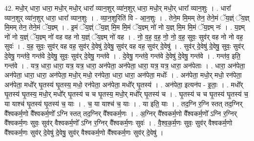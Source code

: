 \documentclass[17pt]{extarticle}
\begin{document}
42. मधो॒र् धारा॒ धारा॒ मधो॒र् मधो॒र् धारा᳚ व्यान॒शुर् व्या॑न॒शुर् धारा॒ मधो॒र् मधो॒र् धारा᳚ व्यान॒शुः । . धारा᳚ व्यान॒शुर् व्या॑न॒शुर् धारा॒ धारा᳚ व्यान॒शुः । . व्या॒न॒शुरिति॑ वि - आ॒न॒शुः । . तेने॒म मि॒मम् तेन॒ तेने॒मं ॅय॒ज्ञ्ं ॅय॒ज्ञ् मि॒मम् तेन॒ तेने॒मं ॅय॒ज्ञ्म् । . इ॒मं ॅय॒ज्ञ्ं ॅय॒ज्ञ् मि॒म मि॒मं ॅय॒ज्ञ्म् नो॑ नो य॒ज्ञ् मि॒म मि॒मं ॅय॒ज्ञ्म् नः॑ । . य॒ज्ञ्म् नो॑ नो य॒ज्ञ्ं ॅय॒ज्ञ्म् नो॑ वह वह नो य॒ज्ञ्ं ॅय॒ज्ञ्म् नो॑ वह । . नो॒ व॒ह॒ व॒ह॒ नो॒ नो॒ व॒ह॒ सुवः॒ सुव॑र् वह नो नो वह॒ सुवः॑ । . व॒ह॒ सुवः॒ सुव॑र् वह वह॒ सुव॑र् दे॒वेषु॑ दे॒वेषु॒ सुव॑र् वह वह॒ सुव॑र् दे॒वेषु॑ । . सुव॑र् दे॒वेषु॑ दे॒वेषु॒ सुवः॒ सुव॑र् दे॒वेषु॒ गन्त॑वे॒ गन्त॑वे दे॒वेषु॒ सुवः॒ सुव॑र् दे॒वेषु॒ गन्त॑वे । . दे॒वेषु॒ गन्त॑वे॒ गन्त॑वे दे॒वेषु॑ दे॒वेषु॒ गन्त॑वे । . गन्त॑व॒ इति॒ गन्त॑वे । . यत्र॒ धारा॒ धारा॒ यत्र॒ यत्र॒ धारा॒ अन॑पेता॒ अन॑पेता॒ धारा॒ यत्र॒ यत्र॒ धारा॒ अन॑पेताः । . धारा॒ अन॑पेता॒ अन॑पेता॒ धारा॒ धारा॒ अन॑पेता॒ मधो॒र् मधो॒ रन॑पेता॒ धारा॒ धारा॒ अन॑पेता॒ मधोः᳚ । . अन॑पेता॒ मधो॒र् मधो॒ रन॑पेता॒ अन॑पेता॒ मधो᳚र् घृ॒तस्य॑ घृ॒तस्य॒ मधो॒ रन॑पेता॒ अन॑पेता॒ मधो᳚र् घृ॒तस्य॑ । . अन॑पेता॒ इत्यन॑प - इ॒ताः॒ । . मधो᳚र् घृ॒तस्य॑ घृ॒तस्य॒ मधो॒र् मधो᳚र् घृ॒तस्य॑ च च घृ॒तस्य॒ मधो॒र् मधो᳚र् घृ॒तस्य॑ च । . घृ॒तस्य॑ च च घृ॒तस्य॑ घृ॒तस्य॑ च॒ या याश्च॑ घृ॒तस्य॑ घृ॒तस्य॑ च॒ याः । . च॒ या याश्च॑ च॒ याः । . या इति॒ याः । . तद॒ग्नि र॒ग्नि स्तत् तद॒ग्निर् वै᳚श्वकर्म॒णो वै᳚श्वकर्म॒णो᳚ ऽग्नि स्तत् तद॒ग्निर् वै᳚श्वकर्म॒णः । . अ॒ग्निर् वै᳚श्वकर्म॒णो वै᳚श्वकर्म॒णो᳚ ऽग्नि र॒ग्निर् वै᳚श्वकर्म॒णः सुवः॒ सुव॑र् वैश्वकर्म॒णो᳚ ऽग्नि र॒ग्निर् वै᳚श्वकर्म॒णः सुवः॑ । . वै॒श्व॒क॒र्म॒णः सुवः॒ सुव॑र् वैश्वकर्म॒णो वै᳚श्वकर्म॒णः सुव॑र् दे॒वेषु॑ दे॒वेषु॒ सुव॑र् वैश्वकर्म॒णो वै᳚श्वकर्म॒णः सुव॑र् दे॒वेषु॑ । \newline
\end{document}
